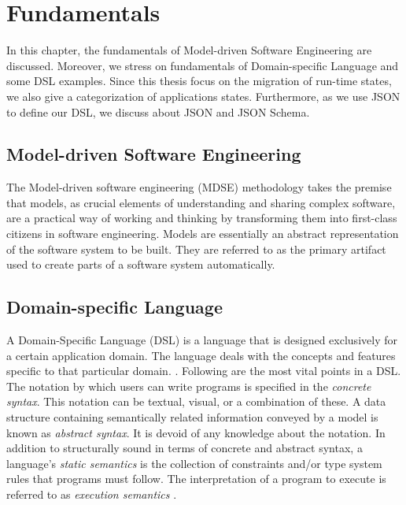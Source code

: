 \chapter{Fundamentals}
\label{ch:fundamentals}
In this chapter, the fundamentals of Model-driven Software Engineering are discussed. Moreover, we stress on fundamentals of Domain-specific Language and some DSL examples. Since this thesis focus on the migration of run-time states, we also give a categorization of applications states. Furthermore, as we use JSON to define our DSL, we discuss about JSON and JSON Schema.

\section{Model-driven Software Engineering}
The Model-driven software engineering (MDSE) methodology takes the premise that models, as crucial elements of understanding and sharing complex software, are a practical way of working and thinking by transforming them into first-class citizens in software engineering\cite{mdse}. Models are essentially an abstract representation of the software system to be built. They are referred to as the primary artifact used to create parts of a software system automatically. \cite{mda-10.5555/579151}

\section{Domain-specific Language}
A Domain-Specific Language (DSL) is a language that is designed exclusively for a certain application domain. The language deals with the concepts and features specific to that particular domain. \cite{dsl}.
Following are the most vital points in a DSL. The notation by which users can write programs is specified in the \textit{concrete syntax}. This notation can be textual, visual, or a combination of these. A data structure containing semantically related information conveyed by a model is known as \textit{abstract syntax}. It is devoid of any knowledge about the notation. In addition to structurally sound in terms of concrete and abstract syntax, a language's \textit{static semantics} is the collection of constraints and/or type system rules that programs must follow. The interpretation of a program to execute is referred to as \textit{execution semantics} \cite{dsl-eng}.


